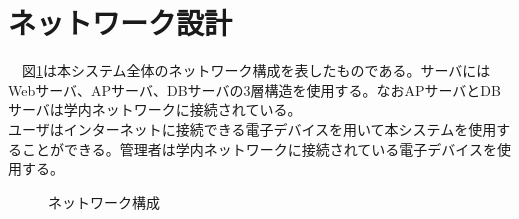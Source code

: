 \documentclass[a4j]{jarticle}
\begin{document}
\section{ネットワーク設計}
　図\ref{network:networktest}は本システム全体のネットワーク構成を表したものである。サーバにはWebサーバ、APサーバ、DBサーバの3層構造を使用する。なおAPサーバとDBサーバは学内ネットワークに接続されている。\\
ユーザはインターネットに接続できる電子デバイスを用いて本システムを使用することができる。管理者は学内ネットワークに接続されている電子デバイスを使用する。
\begin{figure}[H]
\begin{center}
\caption{ネットワーク構成}
\label{network:networktest}
\end{center}
\end{figure}
\end{document}
